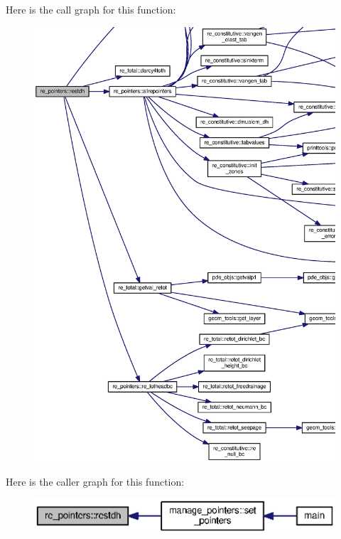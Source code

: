 Here is the call graph for this function\+:\nopagebreak
\begin{figure}[H]
\begin{center}
\leavevmode
\includegraphics[width=350pt]{namespacere__pointers_ab30747cb46458aeac12088c565317b00_cgraph}
\end{center}
\end{figure}




Here is the caller graph for this function\+:\nopagebreak
\begin{figure}[H]
\begin{center}
\leavevmode
\includegraphics[width=350pt]{namespacere__pointers_ab30747cb46458aeac12088c565317b00_icgraph}
\end{center}
\end{figure}


